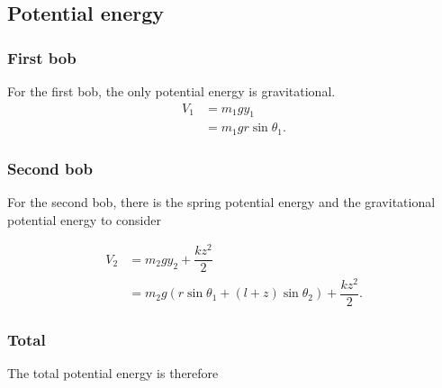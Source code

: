 \documentclass[12pt,a4paper,portrait]{article}
\begin{document}
\subsection{Potential energy}
\subsubsection{First bob}
For the first bob, the only potential energy is gravitational. 
\begin{align*}
	V_1 &= m_1gy_1 \\
	&= m_1 gr\sin{\theta_1}.
\end{align*}

\subsubsection{Second bob}
For the second bob, there is the spring potential energy and the gravitational potential energy to consider

\begin{align*}
	V_2 &= m_2gy_2 + \dfrac{kz^2}{2} \\
	&= m_2 g(r\sin{\theta_1} + (l+z)\sin{\theta_2}) + \dfrac{kz^2}{2}.
\end{align*}

\subsubsection{Total}
The total potential energy is therefore
\end{document}

